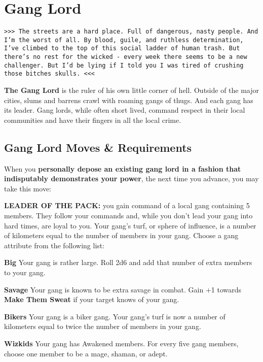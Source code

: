 \documentclass[oneside,10pt]{article}
\begin{document}
\section{Gang Lord}
\begin{multicols}{2}

\texttt{>>> The streets are a hard place. Full of
  dangerous, nasty people. And I'm the worst of
  all. By blood, guile, and ruthless
  determination, I've climbed to the top of this
  social ladder of human trash. But there's no
  rest for the wicked - every week there seems to
  be a new challenger. But I'd be lying if I told
  you I was tired of crushing those bitches skulls. <<<}

\textbf{The Gang Lord} is the ruler of his own little
corner of hell. Outside of the major cities, slums
and barrens crawl with roaming gangs of thugs. And
each gang has its leader. Gang lords, while often
short lived, command respect in their local
communities and have their fingers in all the
local crime. 

\subsection{Gang Lord Moves \& Requirements}

When you \textbf{personally depose an existing
  gang lord in a fashion that indisputably
  demonstrates your power}, the next
time you advance, you may take this move:

\textbf{LEADER OF THE PACK:} you gain command of a
local gang containing 5 members. They follow your commands and, while
you don't lead your gang into hard times, are
loyal to you. Your gang's turf, or sphere of
influence, is a number of kilometers equal to the
number of members in your gang. Choose a gang attribute from the
following list:
\begin{adjustwidth*}{.5cm}{.5cm}
\textbf{Big} Your gang is rather large. Roll 2d6
and add that number of extra members to your gang.

\textbf{Savage} Your gang is known to be extra
savage in combat. Gain +1 towards \textbf{Make
  Them Sweat} if your target knows of your gang.

\textbf{Bikers} Your gang is a biker gang. Your
gang's turf is now a number of kilometers equal to
twice the number of members in your gang.

\textbf{Wizkids} Your gang has Awakened
members. For every five gang members, choose one
member to be a mage, shaman, or adept.


\end{adjustwidth*}
\end{multicols}
\end{document}
